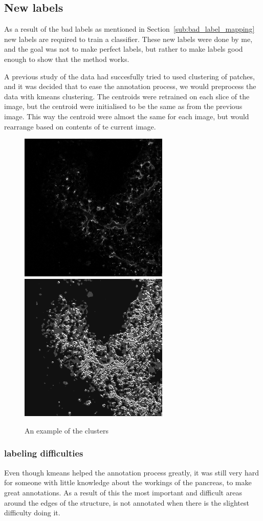 \subsection{New labels} %
\label{sub:new_labels}
As a result of the bad labels as mentioned in Section~\ref{sub:bad_label_mapping} new labels are required to train a classifier.
These new labels were done by me, and the goal was not to make perfect labels, but rather to make labels good enough to show that the method works.

A previous study of the data had succesfully tried to used clustering of patches, and it was decided that to ease the annotation process, we would preprocess the data with kmeans clustering.
The centroids were retrained on each slice of the image, but the centroid were initialised to be the same as from the previous image.
This way the centroid were almost the same for each image, but would rearrange based on contents of te current image.

\begin{figure}[H]
    \centering
    \includegraphics[width=2.8in]{img/3h5022_16.png}
    \includegraphics[width=2.8in]{img/3h5022_16_pred.png}
    \caption{An example of the clusters}
    \label{fig:clustering_example}
\end{figure}

\subsubsection{labeling difficulties} %
\label{ssub:labeling_difficulties}
Even though kmeans helped the annotation process greatly, it was still very hard for someone with little knowledge about the workings of the pancreas, to make great annotations.
As a result of this the most important and difficult areas around the edges of the structure, is not annotated when there is the slightest difficulty doing it.

